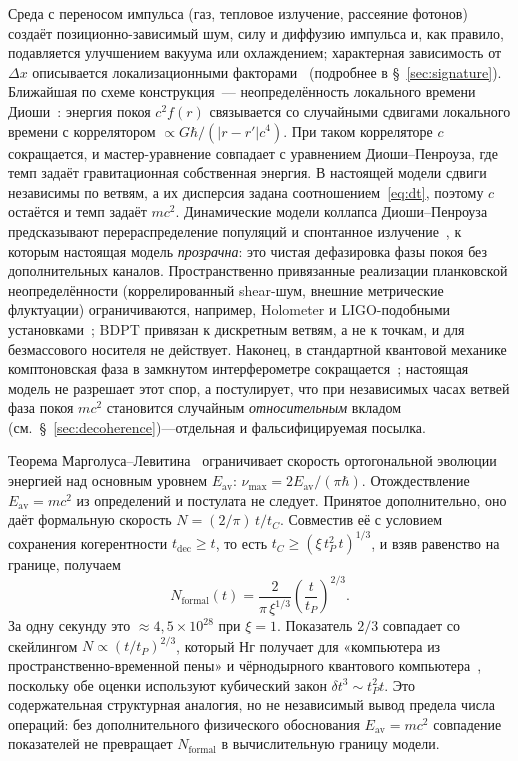 \documentclass[12pt,a4paper]{article}
\begin{document}
Среда с переносом импульса (газ, тепловое излучение, рассеяние фотонов) создаёт позиционно-зависимый шум, силу и диффузию импульса и, как правило, подавляется улучшением вакуума или охлаждением; характерная зависимость от $\Delta x$ описывается локализационными факторами~\cite{hornberger2004tli} (подробнее в \S~\ref{sec:signature}). Ближайшая по схеме конструкция~--- неопределённость локального времени Диоши~\cite{diosi2005}: энергия покоя \(c^2 f(r)\) связывается со случайными сдвигами локального времени с коррелятором \(\propto G\hbar/(|r-r'|c^4)\). При таком корреляторе \(c\) сокращается, и мастер-уравнение совпадает с уравнением Диоши--Пенроуза, где темп задаёт гравитационная собственная энергия. В настоящей модели сдвиги независимы по ветвям, а их дисперсия задана соотношением~\eqref{eq:dt}, поэтому \(c\) остаётся и темп задаёт \(mc^2\). Динамические модели коллапса Диоши--Пенроуза предсказывают перераспределение популяций и спонтанное излучение~\cite{donadi2021}, к которым настоящая модель \emph{прозрачна}: это чистая дефазировка фазы покоя без дополнительных каналов. Пространственно привязанные реализации планковской неопределённости (коррелированный shear-шум, внешние метрические флуктуации) ограничиваются, например, Holometer и LIGO-подобными установками~\cite{chou2017holometer}; BDPT привязан к дискретным ветвям, а не к точкам, и для безмассового носителя не действует. Наконец, в стандартной квантовой механике комптоновская фаза в замкнутом интерферометре сокращается~\cite{wolf2011compton}; настоящая модель не разрешает этот спор, а постулирует, что при независимых часах ветвей фаза покоя $mc^2$ становится случайным \emph{относительным} вкладом (см.~\S~\ref{sec:decoherence})---отдельная и фальсифицируемая посылка.

Теорема Марголуса--Левитина~\cite{margolus1998} ограничивает скорость ортогональной эволюции энергией над основным уровнем $E_{\mathrm{av}}$: $\nu_{\max}=2E_{\mathrm{av}}/(\pi\hbar)$. Отождествление $E_{\mathrm{av}}=mc^2$ из определений и постулата не следует. Принятое дополнительно, оно даёт формальную скорость $N=(2/\pi)\,t/t_C$. Совместив её с условием сохранения когерентности $t_{\mathrm{dec}}\ge t$, то есть $t_C\ge(\xi\,t_P^2\,t)^{1/3}$, и взяв равенство на границе, получаем
\begin{equation}
N_{\mathrm{formal}}(t)=\frac{2}{\pi\,\xi^{1/3}}\left(\frac{t}{t_P}\right)^{2/3}.
\end{equation}
За одну секунду это $\approx4{,}5\times10^{28}$ при $\xi=1$. Показатель $2/3$ совпадает со скейлингом $N\propto(t/t_P)^{2/3}$, который Нг получает для «компьютера из пространственно-временной пены» и чёрнодырного квантового компьютера~\cite{ng2005foam}, поскольку обе оценки используют кубический закон $\delta t^3\sim t_P^2t$. Это содержательная структурная аналогия, но не независимый вывод предела числа операций: без дополнительного физического обоснования $E_{\mathrm{av}}=mc^2$ совпадение показателей не превращает $N_{\mathrm{formal}}$ в вычислительную границу модели.
\end{document}
